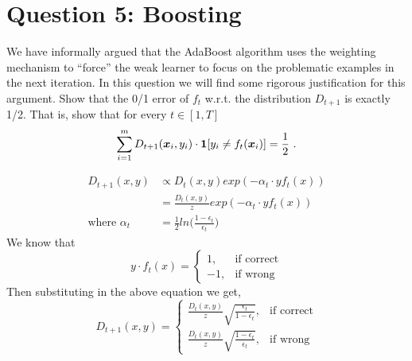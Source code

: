 \documentclass{article}
\begin{document}
\section{Question 5: Boosting}
We have informally argued that the AdaBoost algorithm uses the weighting mechanism to ``force'' the weak learner to focus on the problematic examples
in the next iteration. In this question we will find some rigorous justification for this argument.
Show that the 0/1 error of $f_t$ w.r.t. the distribution $D_{t+1}$ is exactly 1/2. That is, show that for every $t \in [1, T]$
\[
\sum_{i=1}^m D_{t+1}(\boldsymbol{x}_i,y_i) \cdot \boldsymbol{1}[y_i \neq f_t(\boldsymbol{x}_i)]=\frac{1}{2}~.
\]
\begin{mdframed}[backgroundcolor=lightgray]
\begin{align}
    D_{t+1}(x,y) &\propto D_{t}(x,y) exp(-\alpha_{t} \cdot y f_{t}(x)) \\
    &= \frac{D_{t}(x,y)}{z} exp(-\alpha_{t} \cdot y f_{t}(x)) \\
    \text{where } \alpha_{t}& = \frac{1}{2} ln\big(\frac{1-\epsilon_{t}}{\epsilon_{t}}\big)
\end{align}
We know that 
\begin{equation}
    y \cdot f_{t}(x) = 
    \begin{cases}
      1, & \text{if correct} \\
      -1, & \text{if wrong}
    \end{cases}
  \end{equation}
Then substituting in the above equation we get,
  \begin{equation}
     D_{t+1}(x,y) = 
    \begin{cases}
       \frac{D_{t}(x,y)}{z} \sqrt{\frac{\epsilon_{t}}{1-\epsilon_{t}}}, & \text{if correct} \\
      \frac{D_{t}(x,y)}{z} \sqrt{\frac{1-\epsilon_{t}}{\epsilon_{t}}}, & \text{if wrong}
    \end{cases}
  \end{equation}
  

\end{mdframed}
\end{document}
